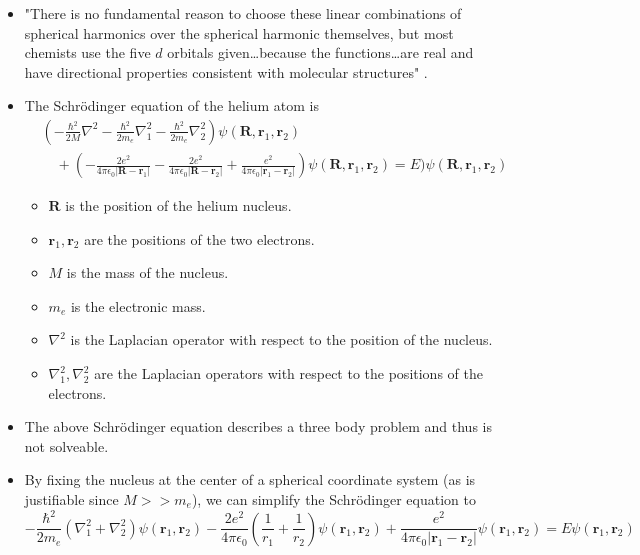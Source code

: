 \documentclass[../notes.tex]{subfiles}
\begin{document}
\begin{itemize}
\begin{table}[h!]
    \end{table}
    \item "There is no fundamental reason to choose these linear combinations of spherical harmonics over the spherical harmonic themselves, but most chemists use the five $d$ orbitals given\dots because the functions\dots are real and have directional properties consistent with molecular structures" \parencite[218]{bib:McQuarrieSimon}.
    \item The Schr\"{o}dinger equation of the helium atom is
    \begin{equation*}
        \begin{split}
            &\left( -\frac{\hbar^2}{2M}\nabla^2-\frac{\hbar^2}{2m_e}\nabla_1^2-\frac{\hbar^2}{2m_e}\nabla_2^2 \right)\psi(\mathbf{R},\mathbf{r}_1,\mathbf{r}_2)\\
            &\quad +\left( -\frac{2e^2}{4\pi\epsilon_0|\mathbf{R}-\mathbf{r}_1|}-\frac{2e^2}{4\pi\epsilon_0|\mathbf{R}-\mathbf{r}_2|}+\frac{e^2}{4\pi\epsilon_0|\mathbf{r}_1-\mathbf{r}_2|} \right)\psi(\mathbf{R},\mathbf{r}_1,\mathbf{r}_2) = E)\psi(\mathbf{R},\mathbf{r}_1,\mathbf{r}_2)
        \end{split}
    \end{equation*}
    \begin{itemize}
        \item $\mathbf{R}$ is the position of the helium nucleus.
        \item $\mathbf{r}_1,\mathbf{r}_2$ are the positions of the two electrons.
        \item $M$ is the mass of the nucleus.
        \item $m_e$ is the electronic mass.
        \item $\nabla^2$ is the Laplacian operator with respect to the position of the nucleus.
        \item $\nabla_1^2,\nabla_2^2$ are the Laplacian operators with respect to the positions of the electrons.
    \end{itemize}
    \item The above Schr\"{o}dinger equation describes a three body problem and thus is not solveable.
    \item By fixing the nucleus at the center of a spherical coordinate system (as is justifiable since $M>>m_e$), we can simplify the Schr\"{o}dinger equation to
    \begin{equation*}
        -\frac{\hbar^2}{2m_e}(\nabla_1^2+\nabla_2^2)\psi(\mathbf{r}_1,\mathbf{r}_2)-\frac{2e^2}{4\pi\epsilon_0}\left( \frac{1}{r_1}+\frac{1}{r_2} \right)\psi(\mathbf{r}_1,\mathbf{r}_2)+\frac{e^2}{4\pi\epsilon_0|\mathbf{r}_1-\mathbf{r}_2|}\psi(\mathbf{r}_1,\mathbf{r}_2) = E\psi(\mathbf{r}_1,\mathbf{r}_2)

\end{equation*}
\end{itemize}
\end{document}
